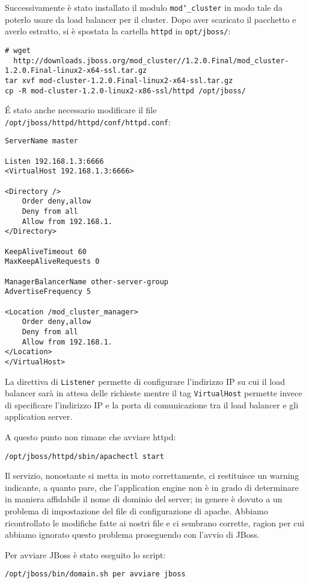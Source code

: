 \documentclass[twoside]{article}
\begin{document}
Successivamente è stato installato il modulo \texttt{mod\char`_cluster} in modo tale da poterlo
usare da load balancer per il cluster. Dopo aver scaricato il pacchetto e averlo estratto,
si è spostata la cartella \texttt{httpd} in \texttt{opt/jboss/}:
\begin{lstlisting}[frame=trBL]
# wget
  http://downloads.jboss.org/mod_cluster//1.2.0.Final/mod_cluster-1.2.0.Final-linux2-x64-ssl.tar.gz
tar xvf mod-cluster-1.2.0.Final-linux2-x64-ssl.tar.gz
cp -R mod-cluster-1.2.0-linux2-x86-ssl/httpd /opt/jboss/
\end{lstlisting}
\'{E} stato anche necessario modificare il file \texttt{/opt/jboss/httpd/httpd/conf/httpd.conf}:
\begin{lstlisting}[frame=trBL]
ServerName master

Listen 192.168.1.3:6666
<VirtualHost 192.168.1.3:6666>

<Directory />
	Order deny,allow
	Deny from all
	Allow from 192.168.1.
</Directory>

KeepAliveTimeout 60
MaxKeepAliveRequests 0

ManagerBalancerName other-server-group
AdvertiseFrequency 5

<Location /mod_cluster_manager>
	Order deny,allow
	Deny from all
	Allow from 192.168.1.
</Location>
</VirtualHost>
\end{lstlisting}
La direttiva di \texttt{Listener} permette di configurare l'indirizzo IP su cui il load balancer sarà
in attesa delle richieste mentre il tag \texttt{VirtualHost} permette invece di specificare l’indirizzo IP e
la porta di comunicazione tra il load balancer e gli application server.

A questo punto non rimane che avviare httpd:
\begin{lstlisting}[frame=trBL]
/opt/jboss/httpd/sbin/apachectl start
\end{lstlisting}

Il servizio, nonostante si metta in moto correttamente, ci restituisce un warning indicante, a quanto pare,
che l'application engine non è in grado di determinare in maniera affidabile il nome di dominio del server;
in genere è dovuto a un problema di impostazione del file di configurazione di apache. Abbiamo ricontrollato
le modifiche fatte ai nostri file e ci sembrano corrette, ragion per cui abbiamo ignorato questo problema
proseguendo con l'avvio di JBoss.

Per avviare JBoss è stato eseguito lo script:
\begin{lstlisting}
/opt/jboss/bin/domain.sh per avviare jboss
\end{lstlisting}

\printbibliography
\end{document}
